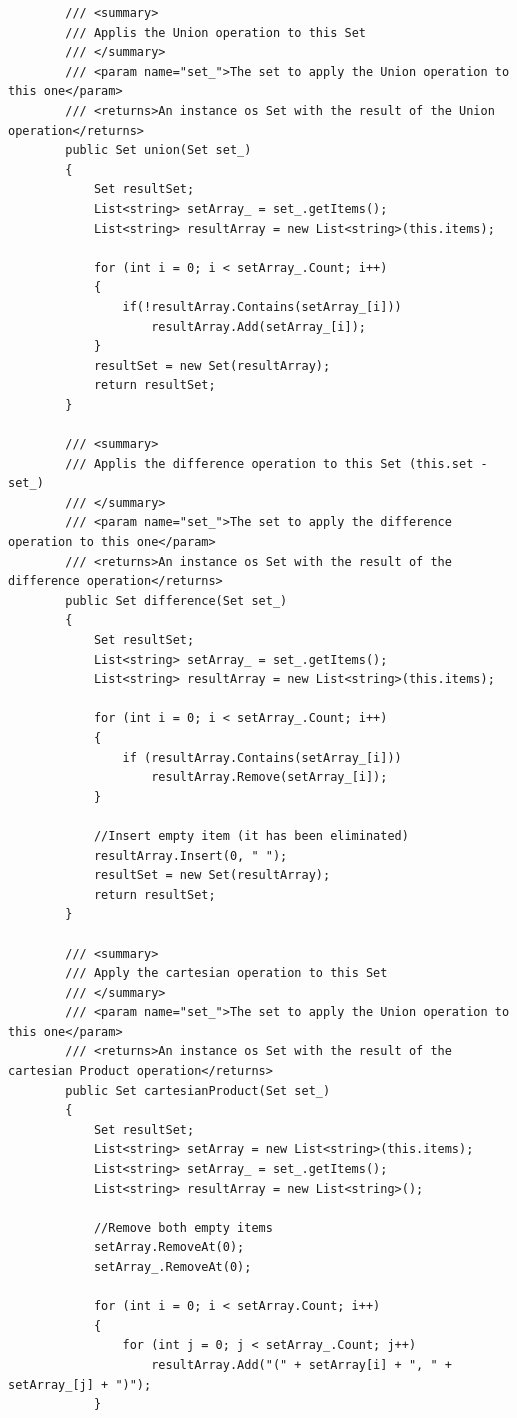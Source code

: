 \begin{lstlisting}
        /// <summary>
        /// Applis the Union operation to this Set
        /// </summary>
        /// <param name="set_">The set to apply the Union operation to this one</param>
        /// <returns>An instance os Set with the result of the Union operation</returns>
        public Set union(Set set_)
        {
            Set resultSet;
            List<string> setArray_ = set_.getItems();
            List<string> resultArray = new List<string>(this.items);

            for (int i = 0; i < setArray_.Count; i++)
            {
                if(!resultArray.Contains(setArray_[i]))
                    resultArray.Add(setArray_[i]);
            }
            resultSet = new Set(resultArray);
            return resultSet;
        }

        /// <summary>
        /// Applis the difference operation to this Set (this.set - set_)
        /// </summary>
        /// <param name="set_">The set to apply the difference operation to this one</param>
        /// <returns>An instance os Set with the result of the difference operation</returns>
        public Set difference(Set set_)
        {
            Set resultSet;
            List<string> setArray_ = set_.getItems();
            List<string> resultArray = new List<string>(this.items);

            for (int i = 0; i < setArray_.Count; i++)
            {
                if (resultArray.Contains(setArray_[i]))
                    resultArray.Remove(setArray_[i]);
            }

            //Insert empty item (it has been eliminated)
            resultArray.Insert(0, " ");
            resultSet = new Set(resultArray);
            return resultSet;
        }

        /// <summary>
        /// Apply the cartesian operation to this Set
        /// </summary>
        /// <param name="set_">The set to apply the Union operation to this one</param>
        /// <returns>An instance os Set with the result of the cartesian Product operation</returns>
        public Set cartesianProduct(Set set_)
        {
            Set resultSet;
            List<string> setArray = new List<string>(this.items);
            List<string> setArray_ = set_.getItems();
            List<string> resultArray = new List<string>();

            //Remove both empty items
            setArray.RemoveAt(0);
            setArray_.RemoveAt(0);

            for (int i = 0; i < setArray.Count; i++)
            {
                for (int j = 0; j < setArray_.Count; j++)
                    resultArray.Add("(" + setArray[i] + ", " + setArray_[j] + ")");
            }


\end{lstlisting}
